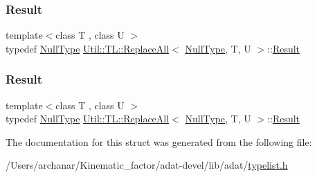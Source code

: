 \mbox{\label{structUtil_1_1TL_1_1ReplaceAll_3_01NullType_00_01T_00_01U_01_4_aa55fd49700fa3811cad906ae93201843}} 
\subsubsection{\texorpdfstring{Result}{Result}\hspace{0.1cm}{\footnotesize\ttfamily [2/3]}}
{\footnotesize\ttfamily template$<$class T , class U $>$ \\
typedef \mbox{\hyperlink{classUtil_1_1NullType}{Null\+Type}} \mbox{\hyperlink{structUtil_1_1TL_1_1ReplaceAll}{Util\+::\+T\+L\+::\+Replace\+All}}$<$ \mbox{\hyperlink{classUtil_1_1NullType}{Null\+Type}}, T, U $>$\+::\mbox{\hyperlink{structUtil_1_1TL_1_1ReplaceAll_3_01NullType_00_01T_00_01U_01_4_aa55fd49700fa3811cad906ae93201843}{Result}}}

\mbox{\label{structUtil_1_1TL_1_1ReplaceAll_3_01NullType_00_01T_00_01U_01_4_aa55fd49700fa3811cad906ae93201843}} 
\subsubsection{\texorpdfstring{Result}{Result}\hspace{0.1cm}{\footnotesize\ttfamily [3/3]}}
{\footnotesize\ttfamily template$<$class T , class U $>$ \\
typedef \mbox{\hyperlink{classUtil_1_1NullType}{Null\+Type}} \mbox{\hyperlink{structUtil_1_1TL_1_1ReplaceAll}{Util\+::\+T\+L\+::\+Replace\+All}}$<$ \mbox{\hyperlink{classUtil_1_1NullType}{Null\+Type}}, T, U $>$\+::\mbox{\hyperlink{structUtil_1_1TL_1_1ReplaceAll_3_01NullType_00_01T_00_01U_01_4_aa55fd49700fa3811cad906ae93201843}{Result}}}



The documentation for this struct was generated from the following file\+:\begin{DoxyCompactItemize}
\item 
/\+Users/archanar/\+Kinematic\+\_\+factor/adat-\/devel/lib/adat/\mbox{\hyperlink{adat-devel_2lib_2adat_2typelist_8h}{typelist.\+h}}\end{DoxyCompactItemize}
